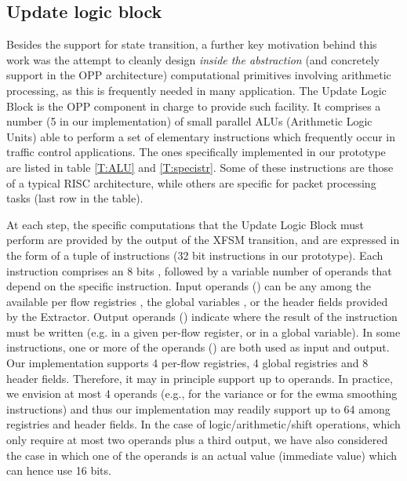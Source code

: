 \documentclass{sig-alternate}
\begin{document}
\subsection{Update logic block}
\label{ss:alu}

Besides the support for state transition, a further key motivation behind this work was the attempt to cleanly design {\em inside the abstraction} (and concretely support in the OPP architecture) computational primitives involving arithmetic processing, as this is frequently needed in many application. The Update Logic Block is the OPP component in charge to provide such facility. It comprises a number (5 in our implementation) of small parallel ALUs (Arithmetic Logic Units) able to perform a set of elementary instructions which frequently occur in traffic control applications. The ones specifically implemented in our prototype are listed in table \ref{T:ALU} and \ref{T:specistr}. Some of these instructions are those of a typical RISC architecture, while others are specific for packet processing tasks (last row in the table). 

At each step, the specific computations that the Update Logic Block must perform are provided by the output of the XFSM transition, and are expressed in the form of a tuple of instructions (32 bit instructions in our prototype). Each instruction comprises an 8 bits , followed by a variable number of operands that depend on the specific instruction. Input operands () can be any among the available per flow registries , the global variables , or the header fields  provided by the Extractor. Output operands () indicate where the result of the instruction must be written (e.g. in a given per-flow register, or in a global variable). In some instructions, one or more of the operands () are both used as input and output. Our implementation supports 4 per-flow registries, 4 global registries and 8 header fields. Therefore, it may in principle support up to  operands. In practice, we envision at most 4 operands (e.g., for the variance or for the ewma smoothing instructions) and thus our implementation may readily support up to 64 among registries and header fields. In the case of logic/arithmetic/shift operations, which only require at most two operands plus a third output, we have also considered the case in which one of the operands is an actual value (immediate value) which can hence use 16 bits.
\end{document}
